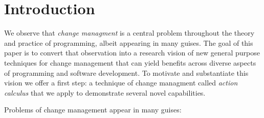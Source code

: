 \documentclass[english,submission]{programming}
\begin{document}
\section{Introduction}

We observe that \textit{change managment} is a central problem throughout the theory and practice of programming, albeit appearing in many guises. The goal of this paper is to convert that observation into a research vision of new general purpose techniques for change management that can yield benefits across diverse aspects of programming and software development. To motivate and substantiate this vision we offer a first step: a technique of change managment called \textit{action calculus} that we apply to demonstrate several novel capabilities.

Problems of change management appear in many guises:
\end{document}
